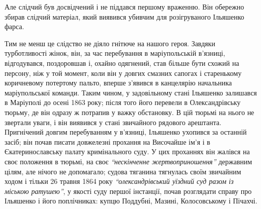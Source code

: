 \documentclass[a4paper,20pt]{report}
\begin{document}
Але слідчий був досвідчений і не піддався першому враженню. Він обережно збирав слідчий матеріал,
який виявився убивчим для розігруваного Ільяшенко фарса.

Тим не менш це слідство не діяло гнітюче на нашого героя. Завдяки турботливості
жінок, він, за час перебування в маріупольській в'язниці, відгодувався,
поздоровшав і, охайно одягнений, став більше бути схожий на персону, ніж у той
момент, коли він у довгих смазних сапогах і старенькому коричневому потертому
пальто, вперше з'явився в канцелярію начальника маріупольської команди. Таким
чином, у задовільному стані Ільяшенко залишався в Маріуполі до осені 1863 року;
після того його перевели в Олександрівську тюрьму, де він одразу ж потрапив у
важку обстановку. В цій тюрьмі на нього не звертали уваги, і він виявився у
стані звичайного рядового арештанта.
Пригнічений довгим перебуванням у в'язниці, Ільяшенко ухопився за останній засіб; він почав писати довжелезні прохання
на Височайше ім'я і в Єкатеринославську палату кримінального суду. У цих проханнях він жалівся на своє положення в тюрьмі,
на своє \emph{``нескінченне жертвоприношення''} державним цілям, але нічого не допомагало; судова тяганина
тягнулась своїм звичайним ходом і тільки 26 травня 1864 року \emph{``олександрівський уїздний суд разом із міською
ратушею''}, у якості суду першої інстанції, почав розглядати справу про Ільяшенко і його поплічниках:
купцю Поддубні, Мазині, Колосовському і Пічахчі.
\end{document}
